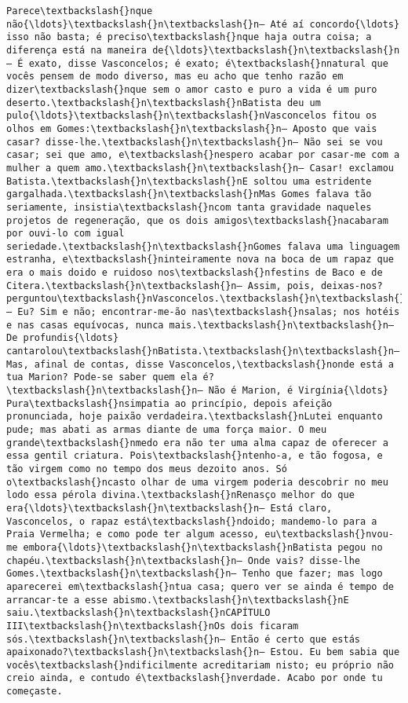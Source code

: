 \documentclass[11pt]{article}
\begin{document}
\begin{Verbatim}[commandchars=\\\{\}]
Parece\textbackslash{}nque não{\ldots}\textbackslash{}n\textbackslash{}n— Até aí concordo{\ldots} isso não basta; é preciso\textbackslash{}nque haja outra coisa; a diferença está na maneira de{\ldots}\textbackslash{}n\textbackslash{}n— É exato, disse Vasconcelos; é exato; é\textbackslash{}nnatural que vocês pensem de modo diverso, mas eu acho que tenho razão em dizer\textbackslash{}nque sem o amor casto e puro a vida é um puro deserto.\textbackslash{}n\textbackslash{}nBatista deu um pulo{\ldots}\textbackslash{}n\textbackslash{}nVasconcelos fitou os olhos em Gomes:\textbackslash{}n\textbackslash{}n— Aposto que vais casar? disse-lhe.\textbackslash{}n\textbackslash{}n— Não sei se vou casar; sei que amo, e\textbackslash{}nespero acabar por casar-me com a mulher a quem amo.\textbackslash{}n\textbackslash{}n— Casar! exclamou Batista.\textbackslash{}n\textbackslash{}nE soltou uma estridente gargalhada.\textbackslash{}n\textbackslash{}nMas Gomes falava tão seriamente, insistia\textbackslash{}ncom tanta gravidade naqueles projetos de regeneração, que os dois amigos\textbackslash{}nacabaram por ouvi-lo com igual seriedade.\textbackslash{}n\textbackslash{}nGomes falava uma linguagem estranha, e\textbackslash{}ninteiramente nova na boca de um rapaz que era o mais doido e ruidoso nos\textbackslash{}nfestins de Baco e de Citera.\textbackslash{}n\textbackslash{}n— Assim, pois, deixas-nos? perguntou\textbackslash{}nVasconcelos.\textbackslash{}n\textbackslash{}n— Eu? Sim e não; encontrar-me-ão nas\textbackslash{}nsalas; nos hotéis e nas casas equívocas, nunca mais.\textbackslash{}n\textbackslash{}n— De profundis{\ldots} cantarolou\textbackslash{}nBatista.\textbackslash{}n\textbackslash{}n— Mas, afinal de contas, disse Vasconcelos,\textbackslash{}nonde está a tua Marion? Pode-se saber quem ela é?\textbackslash{}n\textbackslash{}n— Não é Marion, é Virgínia{\ldots} Pura\textbackslash{}nsimpatia ao princípio, depois afeição pronunciada, hoje paixão verdadeira.\textbackslash{}nLutei enquanto pude; mas abati as armas diante de uma força maior. O meu grande\textbackslash{}nmedo era não ter uma alma capaz de oferecer a essa gentil criatura. Pois\textbackslash{}ntenho-a, e tão fogosa, e tão virgem como no tempo dos meus dezoito anos. Só o\textbackslash{}ncasto olhar de uma virgem poderia descobrir no meu lodo essa pérola divina.\textbackslash{}nRenasço melhor do que era{\ldots}\textbackslash{}n\textbackslash{}n— Está claro, Vasconcelos, o rapaz está\textbackslash{}ndoido; mandemo-lo para a Praia Vermelha; e como pode ter algum acesso, eu\textbackslash{}nvou-me embora{\ldots}\textbackslash{}n\textbackslash{}nBatista pegou no chapéu.\textbackslash{}n\textbackslash{}n— Onde vais? disse-lhe Gomes.\textbackslash{}n\textbackslash{}n— Tenho que fazer; mas logo aparecerei em\textbackslash{}ntua casa; quero ver se ainda é tempo de arrancar-te a esse abismo.\textbackslash{}n\textbackslash{}nE saiu.\textbackslash{}n\textbackslash{}nCAPÍTULO III\textbackslash{}n\textbackslash{}nOs dois ficaram sós.\textbackslash{}n\textbackslash{}n— Então é certo que estás apaixonado?\textbackslash{}n\textbackslash{}n— Estou. Eu bem sabia que vocês\textbackslash{}ndificilmente acreditariam nisto; eu próprio não creio ainda, e contudo é\textbackslash{}nverdade. Acabo por onde tu começaste. 
\end{Verbatim}
\end{document}
